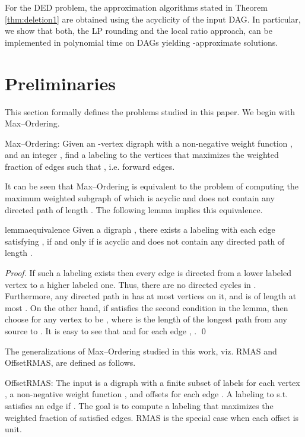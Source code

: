 \documentclass[oribibl]{llncs}
\newcommand{\maxk}{{\sc Max--Ordering}\xspace}
\newcommand{\mink}{{\sc DED}\xspace}
\newcommand{\rmas}{{\sc RMAS}\xspace}
\newcommand{\rmasoff}{{\sc OffsetRMAS}\xspace}
\begin{document}
For the \mink problem, the approximation algorithms stated in Theorem
\ref{thm:deletion1} are obtained using the acyclicity of the input
DAG. In particular, we show that both, the LP rounding and the
local ratio approach, can be implemented in polynomial time on DAGs 
yielding  -approximate solutions.

\section{Preliminaries} \label{sec:prelims}
This section formally defines the problems studied in this paper. We
begin with \maxk.
\begin{definition}\label{def:maxk} \maxk: Given an -vertex digraph  with a non-negative weight function , 
	and an integer , find a labeling to the
	vertices  that maximizes the weighted 
	fraction of edges  such that , i.e. forward edges.
\end{definition}
It can be seen that \maxk is equivalent to the problem of computing
the maximum weighted subgraph of  which is acyclic and does not
contain any directed path of length . The
following lemma implies this equivalence.
\begin{restatable}{lemma}{equivalence}\label{lem:equiv}
	Given a digraph , there exists a labeling
	 with each edge  satisfying
	, if and only if  is acyclic and does not
	contain any directed path of length .
\end{restatable}

\begin{proof}
	If such a labeling  exists then every edge is directed
	from a lower labeled vertex to a higher labeled one. Thus, 
	there are no
	directed cycles in . Furthermore, any directed path in  has
	at most  vertices on it, and is of length at most . On
	the other hand, if  satisfies the second condition in the
	lemma, then
	choose  for any vertex  to be , where
	 is the length of the
	longest path from any source to . It is easy to see that
	 and for each edge , . \qed
\end{proof}

The generalizations of \maxk studied in this work, viz. 
\rmas and \rmasoff, are defined as
follows.
\begin{definition}\label{def:rmasoff}\rmasoff: 
	The input is a digraph  with a
	finite subset  of labels for each
	vertex , a non-negative weight function , and offsets  for each
	edge . A labeling  to  s.t.  satisfies an edge  if . The goal is to compute a labeling that maximizes the
	weighted fraction of satisfied edges. \rmas is the special
	case when each offset is unit.
\end{definition}
\end{document}
